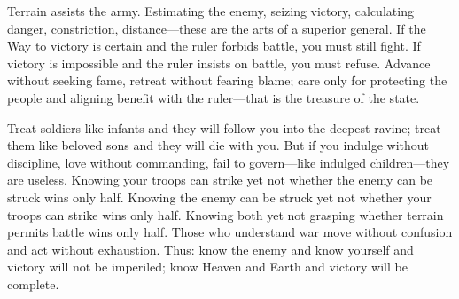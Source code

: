 \documentclass[12pt]{book}
\begin{document}
{Terrain assists the army. Estimating the enemy, seizing victory, calculating danger, constriction, distance—these are the arts of a superior general. If the Way to victory is certain and the ruler forbids battle, you must still fight. If victory is impossible and the ruler insists on battle, you must refuse. Advance without seeking fame, retreat without fearing blame; care only for protecting the people and aligning benefit with the ruler—that is the treasure of the state.

Treat soldiers like infants and they will follow you into the deepest ravine; treat them like beloved sons and they will die with you. But if you indulge without discipline, love without commanding, fail to govern—like indulged children—they are useless. Knowing your troops can strike yet not whether the enemy can be struck wins only half. Knowing the enemy can be struck yet not whether your troops can strike wins only half. Knowing both yet not grasping whether terrain permits battle wins only half. Those who understand war move without confusion and act without exhaustion. Thus: know the enemy and know yourself and victory will not be imperiled; know Heaven and Earth and victory will be complete.}
\end{document}
